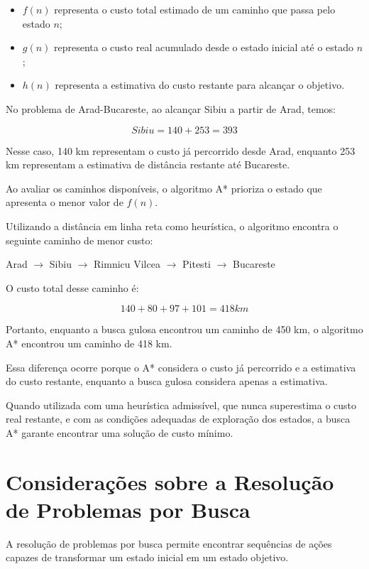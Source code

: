 \begin{itemize}
	\item $f(n)$ representa o custo total estimado de um caminho que passa pelo estado $n$;
	\item $g(n)$ representa o custo real acumulado desde o estado inicial até o estado $n$;
	\item $h(n)$ representa a estimativa do custo restante para alcançar o objetivo.
\end{itemize}

No problema de Arad-Bucareste, ao alcançar Sibiu a partir de Arad, temos:

\[ Sibiu = 140 + 253 = 393 \]


Nesse caso, 140 km representam o custo já percorrido desde Arad, enquanto 253 km representam a estimativa de distância restante até Bucareste.

Ao avaliar os caminhos disponíveis, o algoritmo A* prioriza o estado que apresenta o menor valor de $f(n)$.

Utilizando a distância em linha reta como heurística, o algoritmo encontra o seguinte caminho de menor custo:

\begin{center}
	Arad $\rightarrow$ Sibiu $\rightarrow$ Rimnicu Vilcea
	$\rightarrow$ Pitesti $\rightarrow$ Bucareste
\end{center}

O custo total desse caminho é:


\[140 + 80 + 97 + 101 = 418km\]

Portanto, enquanto a busca gulosa encontrou um caminho de 450 km, o algoritmo A* encontrou um caminho de 418 km.

Essa diferença ocorre porque o A* considera o custo já percorrido e a estimativa do custo restante, enquanto a busca gulosa considera apenas a estimativa.

Quando utilizada com uma heurística admissível, que nunca superestima o custo real restante, e com as condições adequadas de exploração dos estados, a busca A* garante encontrar uma solução de custo mínimo.

\section{Considerações sobre a Resolução de Problemas por Busca}

A resolução de problemas por busca permite encontrar sequências de ações capazes de transformar um estado inicial em um estado objetivo.

